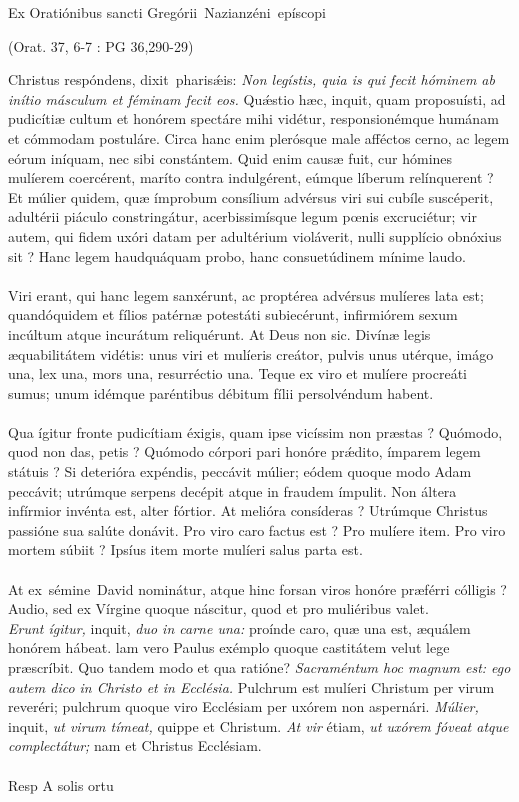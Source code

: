 \documentclass[options]{article}
\begin{document}
Ex Oratiónibus sancti Gregórii Nazianzéni epíscopi
\begin{flushright}
	(Orat. 37, 6-7 : PG 36,290-29)
\end{flushright}
Christus respóndens, dixit pharis\'{æ}is:
\textit{Non legístis, quia is qui fecit hóminem ab inítio másculum et féminam fecit eos.} 
Qu\'{æ}stio hæc, inquit, quam proposuísti, ad pudicítiæ cultum et honórem spectáre mihi vidétur, responsionémque humánam et cómmodam postuláre. Circa hanc enim plerósque male afféctos cerno, ac legem eórum iníquam, nec sibi constántem. Quid enim causæ fuit, cur hómines mulíerem coercérent, maríto contra indulgérent, eúmque líberum relínquerent ? Et múlier quidem, quæ ímprobum consílium advérsus viri sui cubíle suscéperit, adultérii piáculo constringátur, acerbissimísque legum pœnis excruciétur; vir autem, qui fidem uxóri datam per adultérium violáverit, nulli supplício obnóxius sit ? Hanc legem haudquáquam probo, hanc consuetúdinem mínime laudo.\\
\\
Viri erant, qui hanc legem sanxérunt, ac proptérea advérsus mulíeres lata est; quandóquidem et fílios patérnæ potestáti subiecérunt, infirmiórem sexum incúltum atque incurátum reliquérunt. At Deus non sic. Divínæ legis æquabilitátem vidétis: unus viri et mulíeris creátor, pulvis unus utérque, imágo una, lex una, mors una, resurréctio una. Teque ex viro et mulíere procreáti sumus; unum idémque paréntibus débitum fílii persolvéndum habent.\\
\\
Qua ígitur fronte pudicítiam éxigis, quam ipse vicíssim non præstas ? Quómodo, quod non das, petis ? Quómodo córpori pari honóre prǽdito, ímparem legem státuis ? Si deterióra expéndis, peccávit múlier; eódem quoque modo Adam peccávit; utrúmque serpens decépit atque in fraudem ímpulit. Non áltera infírmior invénta est, alter fórtior. At melióra consíderas ? Utrúmque Christus passióne sua salúte donávit. Pro viro caro factus est ? Pro mulíere item. Pro viro mortem súbiit ? Ipsíus item morte mulíeri salus parta est.\\
\\
At ex sémine David nominátur, atque hinc forsan viros honóre præférri cólligis ? Audio, sed ex Vírgine quoque náscitur, quod et pro muliéribus valet.\\
\textit{Erunt ígitur,}
inquit,
\textit{duo in carne una:}
proínde caro, quæ una est, æquálem honórem hábeat. lam vero Paulus exémplo quoque castitátem velut lege præscríbit. Quo tandem modo et qua ratióne?
\textit{Sacraméntum hoc magnum est: ego autem dico in Christo et in Ecclésia.}
Pulchrum est mulíeri Christum per virum reveréri; pulchrum quoque viro Ecclésiam per uxórem non aspernári.
\textit{Múlier,}
inquit,
\textit{ut virum tímeat,}
quippe et Christum.
\textit{At vir}
étiam,
\textit{ut uxórem fóveat atque complectátur;}
nam et Christus Ecclésiam.\\
\\

Resp A solis ortu
   
\end{document}
